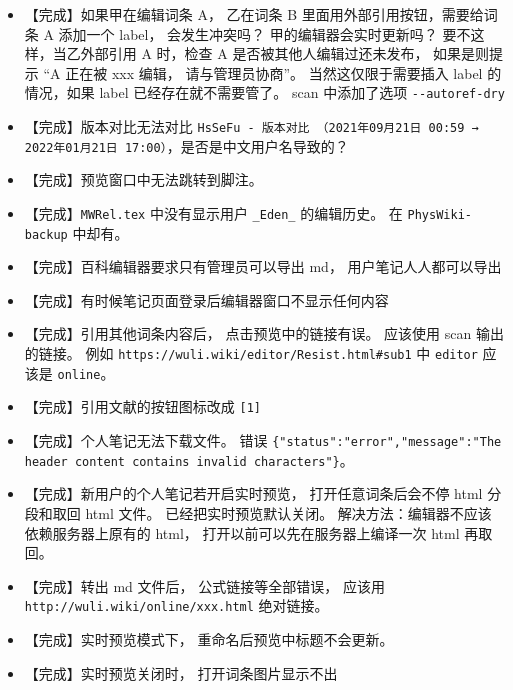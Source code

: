 \begin{itemize}
\item 【完成】如果甲在编辑词条 A， 乙在词条 B 里面用外部引用按钮，需要给词条 A 添加一个 label， 会发生冲突吗？ 甲的编辑器会实时更新吗？ 要不这样，当乙外部引用 A 时，检查 A 是否被其他人编辑过还未发布， 如果是则提示 “A 正在被 xxx 编辑， 请与管理员协商”。 当然这仅限于需要插入 label 的情况，如果 label 已经存在就不需要管了。 scan 中添加了选项 \verb|--autoref-dry|

\item 【完成】版本对比无法对比 \verb|HsSeFu - 版本对比 （2021年09月21日 00:59 → 2022年01月21日 17:00）|，是否是中文用户名导致的？

\item 【完成】预览窗口中无法跳转到脚注。

\item 【完成】\verb|MWRel.tex| 中没有显示用户 \verb|_Eden_| 的编辑历史。 在 \verb|PhysWiki-backup| 中却有。

\item 【完成】百科编辑器要求只有管理员可以导出 md， 用户笔记人人都可以导出

\item 【完成】有时候笔记页面登录后编辑器窗口不显示任何内容

\item 【完成】引用其他词条内容后， 点击预览中的链接有误。 应该使用 scan 输出的链接。 例如 \verb|https://wuli.wiki/editor/Resist.html#sub1| 中 \verb|editor| 应该是 \verb|online|。

\item 【完成】引用文献的按钮图标改成 \verb|[1]|

\item 【完成】个人笔记无法下载文件。 错误 \verb|{"status":"error","message":"The header content contains invalid characters"}|。

\item 【完成】新用户的个人笔记若开启实时预览， 打开任意词条后会不停 html 分段和取回 html 文件。 已经把实时预览默认关闭。 解决方法：编辑器不应该依赖服务器上原有的 html， 打开以前可以先在服务器上编译一次 html 再取回。

\item 【完成】转出 md 文件后， 公式链接等全部错误， 应该用 \verb|http://wuli.wiki/online/xxx.html| 绝对链接。

\item 【完成】实时预览模式下， 重命名后预览中标题不会更新。

\item 【完成】实时预览关闭时， 打开词条图片显示不出


\end{itemize}
